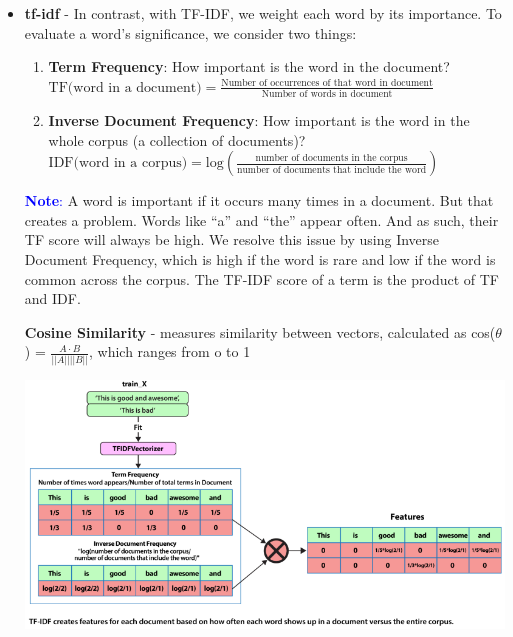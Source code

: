 \documentclass[letterpaper, 10.5pt,landscape]{article}
\begin{document}
\begin{multicols*}{3}
\begin{itemize}[label={--},leftmargin=4mm]
\item \textbf{tf-idf} - In contrast, with TF-IDF, we weight each word by its importance. To evaluate a word’s significance, we consider two things: 
\vspace{-3pt}
\begin{enumerate}
    \item \textbf{Term Frequency}: How important is the word in the document? 
    \(\text{TF(word in a document)} = \frac{\text{Number of occurrences of that word in document}}{\text{Number of words in document}}  \)
    \vspace{-3pt}
    \item \textbf{Inverse Document Frequency}: How important is the word in the whole corpus (a collection of documents)? \\
    \(\text{IDF(word in a corpus)} = \text{log} (\frac{\text{number of documents in the corpus}}{\text{number of documents that include the word}}) \)
    \vspace{-3pt}
\end{enumerate}

\textcolor{blue}{\textbf{Note}:} A word is important if it occurs many times in a document. But that creates a problem. Words like “a” and “the” appear often. And as such, their TF score will always be high. We resolve this issue by using Inverse Document Frequency, which is high if the word is rare and low if the word is common across the corpus. The TF-IDF score of a term is the product of TF and IDF. 


\textbf{Cosine Similarity} - measures similarity between vectors, calculated as cos($\theta$) =
$\frac{A\cdot B}{||A||||B||} $, which ranges from o to 1
\vspace{-3pt}

\vspace{-5pt}
\begin{center}
    \begin{minipage}{1\linewidth}
    \includegraphics[width=\textwidth]{figures/tokenizers_term_freq_TF_IDF.png}
    \end{minipage}
\end{center}
\vspace{-5pt}



\end{itemize}
\end{multicols*}
\end{document}
